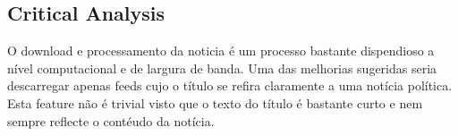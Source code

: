 \subsection{Critical Analysis}
O download e processamento da noticia é um processo bastante dispendioso a nível computacional e de largura de banda. Uma das melhorias sugeridas seria descarregar apenas feeds cujo o título se refira claramente a uma notícia política. Esta feature não é trivial visto que o texto do título é bastante curto e nem sempre reflecte o contéudo da notícia.